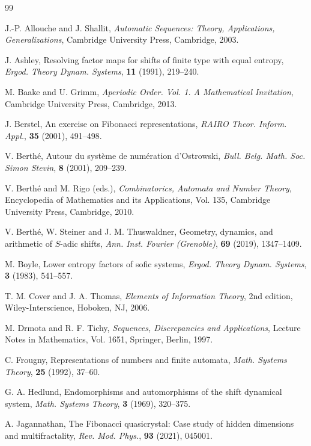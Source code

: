 \begin{thebibliography}{99}

J.-P. Allouche and J. Shallit, \textit{Automatic Sequences: Theory, Applications, Generalizations}, Cambridge University Press, Cambridge, 2003.

J. Ashley, Resolving factor maps for shifts of finite type with equal entropy, \textit{Ergod. Theory Dynam. Systems}, \textbf{11} (1991), 219--240.

M. Baake and U. Grimm, \textit{Aperiodic Order. Vol. 1. A Mathematical Invitation}, Cambridge University Press, Cambridge, 2013.

J. Berstel, An exercise on Fibonacci representations, \textit{RAIRO Theor. Inform. Appl.}, \textbf{35} (2001), 491--498.

V. Berth\'e, Autour du syst\`eme de num\'eration d'Ostrowski, \textit{Bull. Belg. Math. Soc. Simon Stevin}, \textbf{8} (2001), 209--239.

V. Berth\'e and M. Rigo (eds.), \textit{Combinatorics, Automata and Number Theory}, Encyclopedia of Mathematics and its Applications, Vol. 135, Cambridge University Press, Cambridge, 2010.

V. Berth\'e, W. Steiner and J. M. Thuswaldner, Geometry, dynamics, and arithmetic of $S$-adic shifts, \textit{Ann. Inst. Fourier (Grenoble)}, \textbf{69} (2019), 1347--1409.

M. Boyle, Lower entropy factors of sofic systems, \textit{Ergod. Theory Dynam. Systems}, \textbf{3} (1983), 541--557.

T. M. Cover and J. A. Thomas, \textit{Elements of Information Theory}, 2nd edition, Wiley-Interscience, Hoboken, NJ, 2006.

M. Drmota and R. F. Tichy, \textit{Sequences, Discrepancies and Applications}, Lecture Notes in Mathematics, Vol. 1651, Springer, Berlin, 1997.

C. Frougny, Representations of numbers and finite automata, \textit{Math. Systems Theory}, \textbf{25} (1992), 37--60.

G. A. Hedlund, Endomorphisms and automorphisms of the shift dynamical system, \textit{Math. Systems Theory}, \textbf{3} (1969), 320--375.

A. Jagannathan, The Fibonacci quasicrystal: Case study of hidden dimensions and multifractality, \textit{Rev. Mod. Phys.}, \textbf{93} (2021), 045001.


\end{thebibliography}
